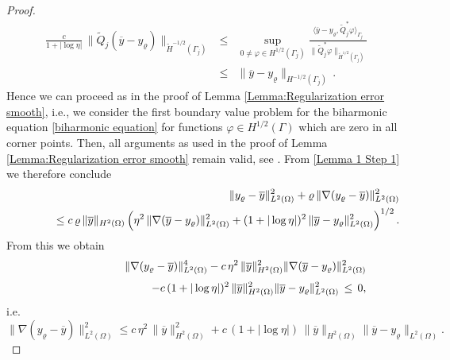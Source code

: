 \documentclass{article}
\numberwithin{equation}{section}
\begin{document}
\begin{proof}
  \begin{eqnarray*}
    \frac{c}{1 + |\log \eta|} \,
    \| \widetilde{Q}_j (\overline{y} - y_\varrho)
    \|_{\widetilde{H}^{-1/2}(\Gamma_j)}
    & \leq & \sup\limits_{0 \neq \varphi \in H^{1/2}(\Gamma_j)}
          \frac{\langle \overline{y} - y_\varrho, \widetilde{Q}_j^*
          \varphi \rangle_{\Gamma_j}}
          {\| \widetilde{Q}_j^* \varphi \|_{\widetilde{H}^{1/2}(\Gamma_j)}}
    \\[2mm]
    & \leq & \| \overline{y} - y_\varrho \|_{H^{-1/2}(\Gamma_j)} \, .
  \end{eqnarray*}
  Hence we can proceed as in the proof of
  Lemma \ref{Lemma:Regularization error smooth}, i.e.,
  we consider the first boundary value problem for the biharmonic equation
  \eqref{biharmonic equation} for functions $\varphi \in H^{1/2}(\Gamma)$
  which are zero in all corner points. Then, all arguments as used
  in the proof of  Lemma \ref{Lemma:Regularization error smooth}
  remain valid, see \cite{ZhangXu:2014SINUM}.
  From \eqref{Lemma 1 Step 1} we therefore conclude
  \begin{eqnarray*}
    && \| y_\varrho - \overline{y} \|^2_{L^2(\Omega)}
       +
       \varrho \, \| \nabla (y_\varrho - \overline{y}) \|^2_{L^2(\Omega)} \\
    && \hspace*{1cm} \leq c \, \varrho \, \| \overline{y} \|_{H^2(\Omega)}
       \left( \eta^2 \, \| \nabla (\overline{y} - y_\varrho) \|^2_{L^2(\Omega)}
       +
       (1+|\log \eta|)^2 \, \| \overline{y} - y_\varrho \|_{L^2(\Omega)}^2
       \right)^{1/2} .
  \end{eqnarray*}
  From this we obtain
  \begin{eqnarray*}
    && \| \nabla (y_\varrho - \overline{y}) \|^4_{L^2(\Omega)} 
       - c \, \eta^2 \, \| \overline{y} \|_{H^2(\Omega)}^2
       \| \nabla (\overline{y} - y_\varrho) \|^2_{L^2(\Omega)} \\[1mm]
    && \hspace*{3cm}
       -
       c \, (1+|\log \eta|)^2 \, \| \overline{y} \|_{H^2(\Omega)}^2
       \| \overline{y} - y_\varrho \|_{L^2(\Omega)}^2
       \, \leq \, 0,
  \end{eqnarray*}
  i.e.
  \begin{equation}\label{Lemma 2 Step 1}
    \| \nabla (y_\varrho - \overline{y}) \|^2_{L^2(\Omega)} \leq
    c \, \eta^2 \, \| \overline{y} \|_{H^2(\Omega)}^2 +
    c \, (1+|\log \eta|) \, \| \overline{y} \|_{H^2(\Omega)}
    \| \overline{y} - y_\varrho \|_{L^2(\Omega)}.
  \end{equation}

\end{proof}
\end{document}

